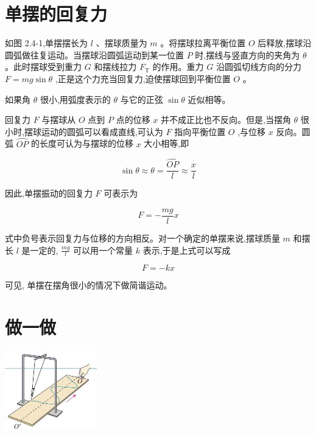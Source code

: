 \documentclass[10pt]{article}
\begin{document}
\section*{单摆的回复力}

如图 2.4-1,单摆摆长为 \(l\) 、摆球质量为 \(m\) 。将摆球拉离平衡位置 \(O\) 后释放,摆球沿圆弧做往复运动。当摆球沿圆弧运动到某一位置 \(P\) 时,摆线与竖直方向的夹角为 \(\theta\) 。此时摆球受到重力 \(G\) 和摆线拉力 \({F}_{\mathrm{T}}\) 的作用。重力 \(G\) 沿圆弧切线方向的分力 \(F = {mg}\sin \theta\) ,正是这个力充当回复力,迫使摆球回到平衡位置 \(O\) 。

\begin{mdframed}

如果角 \(\theta\) 很小,用弧度表示的 \(\theta\) 与它的正弦 \(\sin \theta\) 近似相等。

\end{mdframed}

回复力 \(F\) 与摆球从 \(O\) 点到 \(P\) 点的位移 \(x\) 并不成正比也不反向。但是,当摆角 \(\theta\) 很小时,摆球运动的圆弧可以看成直线,可认为 \(F\) 指向平衡位置 \(O\) ,与位移 \(x\) 反向。圆弧 \(\overset{⏜}{OP}\) 的长度可认为与摆球的位移 \(x\) 大小相等,即

\[
\sin \theta \approx \theta = \frac{\overset{⏜}{OP}}{l} \approx \frac{x}{l}
\]

因此,单摆振动的回复力 \(F\) 可表示为

\[
F = - \frac{mg}{l}x
\]

式中负号表示回复力与位移的方向相反。对一个确定的单摆来说,摆球质量 \(m\) 和摆长 \(l\) 是一定的, \(\frac{mg}{l}\) 可以用一个常量 \(k\) 表示,于是上式可以写成

\[
F = - {kx}
\]

可见, 单摆在摆角很小的情况下做简谐运动。

\section*{做一做}

\begin{center}
\includegraphics[max width=0.3\textwidth]{images/01910e4c-ebb8-7d2c-8f2f-2375bc1d2d12_52_217184.jpg}
\end{center}
\end{document}
